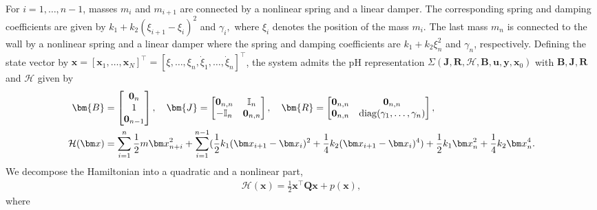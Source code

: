 \documentclass{article}
\newcommand{\bmJ}{\bm{J}}
\newcommand{\bmR}{\bm{R}}
\newcommand{\bmB}{\bm{B}}
\newcommand{\bmQ}{\bm{Q}}
\newcommand{\Jmat}[1]{\mathbf{J}_{#1}}%
\newcommand{\curlyH}{\mathcal{H}}
\newcommand{\statex}{{\bm x}}
\newcommand{\outputy}{{\bm y}}
\newcommand{\inputu}{\bm{u}}
\newcommand{\bzero}{\mathbf{0}}
\newcommand{\SysLable}{\Sigma}
\newcommand{\FOMsize}{N}
\newcommand{\FOMsizeHalf}{n}
\newcommand{\DEIMsplitHam}{p}
\newcommand{\pH}{\textsf{pH}\xspace}
\begin{document}
For $i=1,\ldots,\FOMsizeHalf-1$, masses $m_i$ and $m_{i+1}$ are connected by a nonlinear spring and a linear damper. 
The corresponding spring and damping coefficients are given by
	$
	k_1+k_2(\xi_{i+1}-\xi_{i})^2$ and $\gamma_i,
	$
	where $\xi_i$ denotes the position of the mass $m_{i}$.
	The last mass $m_n$ is connected to the wall by a nonlinear spring and a linear damper where the spring and damping coefficients are $k_1+k_2\xi_{\FOMsizeHalf}^2$ and $\gamma_{\FOMsizeHalf}$, respectively. Defining the state vector by $\statex=[\statex_1,\ldots,\statex_{\FOMsize}]^{\top}=[\xi,\ldots,\xi_\FOMsizeHalf,\dot{\xi}_1,\ldots,\dot{\xi}_\FOMsizeHalf]^{\top}$, the system admits the \pH representation $\SysLable(\bmJ,\bmR,\curlyH,\bmB,\inputu,\outputy,\statex_{0})$ with $\bmB, \bmJ, \bmR$ and $\curlyH$ given by
	\begin{align*}
		\bmB&=
		\begin{bmatrix}
			\bzero_\FOMsizeHalf\\
			1\\
			\bzero_{\FOMsizeHalf-1}
		\end{bmatrix},\quad
		\bmJ= %
		\begin{bmatrix}
			\bzero_{\FOMsizeHalf,\FOMsizeHalf} & \mathbb{I}_{\FOMsizeHalf}\\
			-\mathbb{I}_{\FOMsizeHalf} & \bzero_{\FOMsizeHalf,\FOMsizeHalf}
		\end{bmatrix},\quad
		\bmR = 
		\begin{bmatrix}
			\bzero_{\FOMsizeHalf,\FOMsizeHalf} & \bzero_{\FOMsizeHalf,\FOMsizeHalf}\\
			\bzero_{\FOMsizeHalf,\FOMsizeHalf} & {\rm diag}(\gamma_1,\ldots, \gamma_\FOMsizeHalf)
		\end{bmatrix},
		\\
		\curlyH(\statex)&= 
		\sum_{i=1}^{\FOMsizeHalf}\frac{1}{2}m\statex_{\FOMsizeHalf+i}^2
		+\sum_{i=1}^{\FOMsizeHalf-1}
		(\frac{1}{2}k_1 (\statex_{i+1}-\statex_{i})^{2} +\frac{1}{4}k_2 (\statex_{i+1}-\statex_{i})^4)
		+
		\frac{1}{2}k_1 \statex_{\FOMsizeHalf}^{2} +\frac{1}{4}k_2 \statex_{\FOMsizeHalf}^4.
	\end{align*}
	We decompose the Hamiltonian into a quadratic and a nonlinear part, 
	\begin{align*}\curlyH(\statex)=\frac{1}{2}\statex^{\top}\bmQ\statex+
	\DEIMsplitHam
	(\statex),
	\end{align*}
	where 
\end{document}
